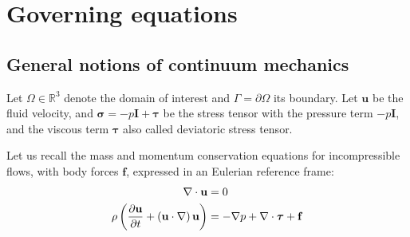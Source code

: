 \documentclass[11 pt]{report}
\begin{document}

\chapter{Governing equations}
\label{chap:chapEq}

\section{General notions of continuum mechanics}
Let $\Omega \in \mathbb{R}^3$ denote the domain of interest and $\Gamma=\partial \Omega$ its boundary. Let $\mathbf{u}$ be the fluid velocity, and $\boldsymbol{\sigma}=-p\mathbf{I}+\boldsymbol{\tau}$ be the stress tensor with the pressure term $-p\mathbf{I}$, and the viscous term $\boldsymbol\tau$ also called deviatoric stress tensor.

Let us recall the mass and momentum conservation equations for incompressible flows, with body forces $\mathbf{f}$, expressed in an Eulerian reference frame:
\begin{align}
    \nabla \cdot \mathbf{u} &= 0\\
    \rho \left(\pdv{\mathbf{u}}{t} + \left(\mathbf{u} \cdot \nabla\right) \mathbf{u}\right) &= -\nabla p + \nabla \cdot \boldsymbol\tau + \mathbf{f} \label{eq:full_momentum}
\end{align}

\end{document}

